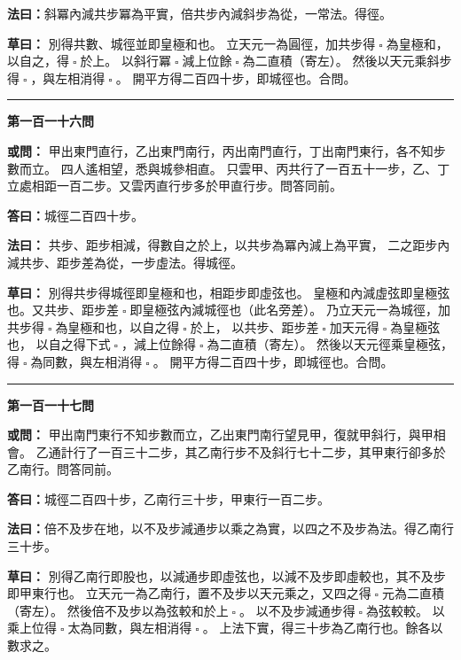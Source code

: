 \documentclass[11pt,a4paper]{article}
\let\origsquare\square
\renewcommand{\square}{\ensuremath{\origsquare}}%
\newcommand{\longline}{\noindent\rule{\textwidth}{0.4pt}}
\newcommand{\owen}[1]{%
  \par\vspace{0.4em}%
  \noindent\textcolor{problemcolor}{\textbf{或問：}}{\tradfont #1}\par\nopagebreak%
}
\newcommand{\fayue}[1]{%
  \par\noindent\textcolor{methodcolor}{\textbf{法曰：}}{\tradfont #1}\par\nopagebreak%
}
\newcommand{\tsaoyue}[1]{%
  \par\noindent\textcolor{workcolor}{\textbf{草曰：}}{\tradfont #1}\par%
}
\newcommand{\dayue}[1]{%
  \par\noindent\textcolor{anscolor}{\textbf{答曰：}}{\tradfont #1}\par\nopagebreak%
}
\newcommand{\wen}[1]{\par\vspace{0.3em}\noindent\textcolor{problemcolor}{\textbf{第#1問}}\par}
\begin{document}
\fayue{斜冪內減共步冪為平實，倍共步內減斜步為從，一常法。得徑。}

\tsaoyue{%
別得共數、城徑並即皇極和也。
立天元一為圓徑，加共步得$ \; \square \; $為皇極和，以自之，得$ \; \square \; $於上。
以斜行冪$ \; \square \; $減上位餘$ \; \square \; $為二直積（寄左）。
然後以天元乘斜步得$ \; \square \; $，與左相消得$ \; \square \; $。
開平方得二百四十步，即城徑也。合問。}

\vspace{0.5cm}
\begin{center}
\longline
\end{center}

\wen{一百一十六}
\owen{%
甲出東門直行，乙出東門南行，丙出南門直行，丁出南門東行，各不知步數而立。
四人遙相望，悉與城參相直。
只雲甲、丙共行了一百五十一步，乙、丁立處相距一百二步。又雲丙直行步多於甲直行步。問答同前。}
\dayue{城徑二百四十步。}

\fayue{%
共步、距步相減，得數自之於上，以共步為冪內減上為平實，
二之距步內減共步、距步差為從，一步虛法。得城徑。}

\tsaoyue{%
別得共步得城徑即皇極和也，相距步即虛弦也。
皇極和內減虛弦即皇極弦也。又共步、距步差$ \; \square \; $即皇極弦內減城徑也（此名旁差）。
乃立天元一為城徑，加共步得$ \; \square \; $為皇極和也，以自之得$ \; \square \; $於上，
以共步、距步差$ \; \square \; $加天元得$ \; \square \; $為皇極弦也，
以自之得下式$ \; \square \; $，減上位餘得$ \; \square \; $為二直積（寄左）。
然後以天元徑乘皇極弦，得$ \; \square \; $為同數，與左相消得$ \; \square \; $。
開平方得二百四十步，即城徑也。合問。}

\vspace{0.5cm}
\begin{center}
\longline
\end{center}

\wen{一百一十七}
\owen{%
甲出南門東行不知步數而立，乙出東門南行望見甲，復就甲斜行，與甲相會。
乙通計行了一百三十二步，其乙南行步不及斜行七十二步，其甲東行卻多於乙南行。問答同前。}
\dayue{城徑二百四十步，乙南行三十步，甲東行一百二步。}

\fayue{倍不及步在地，以不及步減通步以乘之為實，以四之不及步為法。得乙南行三十步。}

\tsaoyue{%
別得乙南行即股也，以減通步即虛弦也，以減不及步即虛較也，其不及步即甲東行也。
立天元一為乙南行，置不及步以天元乘之，又四之得$ \; \square \; $元為二直積（寄左）。
然後倍不及步以為弦較和於上$ \; \square \; $。
以不及步減通步得$ \; \square \; $為弦較較。
以乘上位得$ \; \square \; $太為同數，與左相消得$ \; \square \; $。
上法下實，得三十步為乙南行也。餘各以數求之。}
\end{document}
